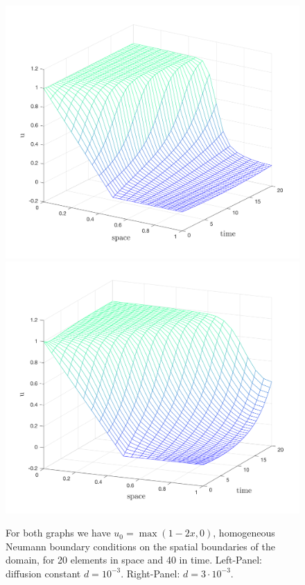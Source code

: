 \documentclass[../draft_1.tex]{subfiles}
\begin{document}
\begin{figure}[ht!]
	\centering
	\includegraphics[scale=0.4]{images/implementation/sol_d0_001_1by20_20by40elem}
	\includegraphics[scale=0.4]{images/implementation/sol_d0_003_1by20_20by40elem}
	\caption{For both graphs we have $u_0 = \max(1-2x, 0)$, homogeneous Neumann boundary conditions on the spatial boundaries of the domain, for 20 elements in space and 40 in time. Left-Panel: diffusion constant $d= 10^{-3}$. Right-Panel: $d=3 \cdot 10^{-3}$.}
	\label{fig:md_sol}
\end{figure}
\end{document}
